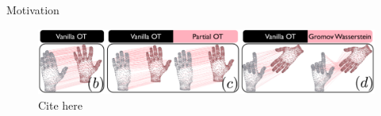 \documentclass{beamer}
\newcommand{\gw}{\text{GW}}
\newcommand{\gh}{\text{GH}}
\newcommand{\rmd}{\mathrm{d}}
\begin{document}
\begin{frame}{Motivation}
  \begin{figure}
    \centering
    \includegraphics[scale=0.25]{OT_new/intro_ot.png}
    \caption*{\scriptsize{Cite here}}
  \end{figure}

\end{frame}





\end{document}

